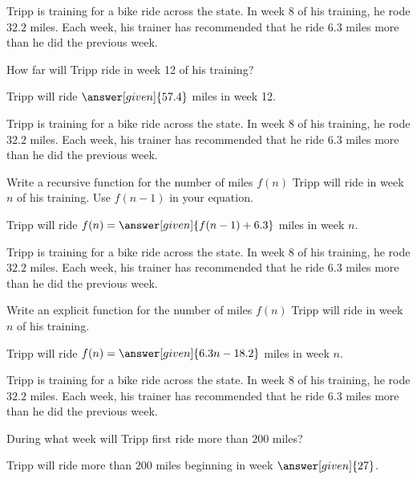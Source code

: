 \documentclass[nooutcomes]{ximera}
\begin{document}
\begin{problem}
Tripp is training for a bike ride across the state.  In week 8 of his training, he rode $32.2$ miles.  Each week, his trainer has recommended that he ride $6.3$ miles more than he did the previous week.

How far will Tripp ride in week 12 of his training?

\begin{prompt}
Tripp will ride $\answer[given]{57.4}$ miles in week 12.
\end{prompt}
\end{problem}



\begin{problem}
Tripp is training for a bike ride across the state.  In week 8 of his training, he rode $32.2$ miles.  Each week, his trainer has recommended that he ride $6.3$ miles more than he did the previous week.

Write a recursive function for the number of miles $f(n)$ Tripp will ride in week $n$ of his training.  Use $f(n-1)$ in your equation.

\begin{prompt}
Tripp will ride $f(n) = \answer[given]{f(n-1) + 6.3}$ miles in week $n$.
\end{prompt}
\end{problem}



\begin{problem}
Tripp is training for a bike ride across the state.  In week 8 of his training, he rode $32.2$ miles.  Each week, his trainer has recommended that he ride $6.3$ miles more than he did the previous week.

Write an explicit function for the number of miles $f(n)$ Tripp will ride in week $n$ of his training.

\begin{prompt}
Tripp will ride $f(n) = \answer[given]{6.3n-18.2}$ miles in week $n$.
\end{prompt}
\end{problem}




\begin{problem}
Tripp is training for a bike ride across the state.  In week 8 of his training, he rode $32.2$ miles.  Each week, his trainer has recommended that he ride $6.3$ miles more than he did the previous week.

During what week will Tripp first ride more than $200$ miles?

\begin{prompt}
Tripp will ride more than $200$ miles beginning in week $\answer[given]{27}$.
\end{prompt}
\end{problem}
\end{document}

